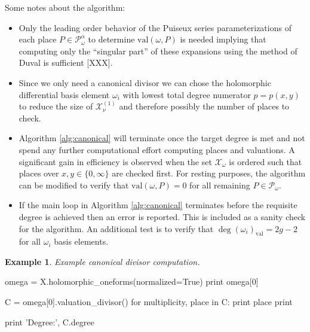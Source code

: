 \documentclass[12pt]{article}
\theoremstyle{definition}
\newtheorem{example}[theorem]{Example}
\begin{document}
Some notes about the algorithm:
\begin{itemize}
\item Only the leading order behavior of the Puiseux series
  parameterizations of each place $P \in \mathcal{P}_\omega^\alpha$ to
  determine $\text{val}(\omega,P)$ is needed implying that computing
  only the ``singular part'' of these expansions using the method of
  Duval is sufficient [XXX].
\item Since we only need a canonical divisor we can chose the
  holomorphic differential basis element $\omega_i$ with lowest total
  degree numerator $p=p(x,y)$ to reduce the size of
  $\mathcal{X}_\nu^{(1)}$ and therefore possibly the number of places to
  check.
\item Algorithm \ref{alg:canonical} will terminate once the target
  degree is met and not spend any further computational effort computing
  places and valuations. A significant gain in efficiency is observed
  when the set $\mathcal{X}_\omega$ is ordered such that places over
  $x,y \in \{0,\infty\}$ are checked first. For resting purposes, the
  algorithm can be modified to verify that $\text{val}(\omega,P) = 0$
  for all remaining $P\in \mathcal{P}_\omega$.
\item If the main loop in Algorithm \ref{alg:canonical} terminates
  before the requisite degree is achieved then an error is
  reported. This is included as a sanity check for the algorithm. An
  additional test is to verify that $\deg (\omega_i)_\text{val} = 2g-2$
  for all $\omega_i$ basis elements.
\end{itemize}

\begin{example}
  {\it Example canonical divisor computation.}

\begin{ipythoninput}
omega = X.holomorphic_oneforms(normalized=True)
print omega[0]
\end{ipythoninput}
\begin{ipythonoutput}
[XXX]
\end{ipythonoutput}
\begin{ipythoninput}
C = omega[0].valuation_divisor()
for multiplicity, place in C:
    print place
    print

print 'Degree:', C.degree
\end{ipythoninput}
\begin{ipythonoutput}
[XXX]
\end{ipythonoutput}
\end{example}
\end{document}
